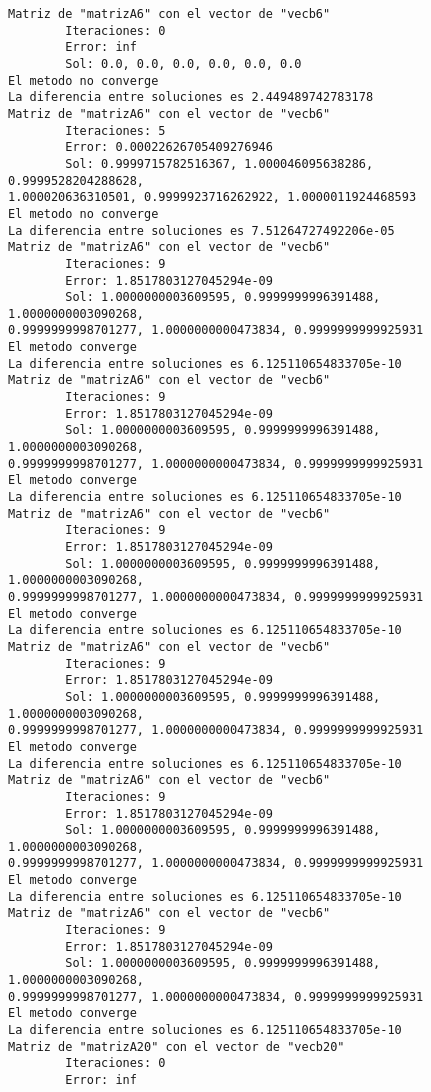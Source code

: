 \documentclass[11pt]{article}
\begin{document}
    \begin{Verbatim}[commandchars=\\\{\}]
Matriz de "matrizA6" con el vector de "vecb6"
        Iteraciones: 0
        Error: inf
        Sol: 0.0, 0.0, 0.0, 0.0, 0.0, 0.0
El metodo no converge
La diferencia entre soluciones es 2.449489742783178
Matriz de "matrizA6" con el vector de "vecb6"
        Iteraciones: 5
        Error: 0.00022626705409276946
        Sol: 0.9999715782516367, 1.000046095638286, 0.9999528204288628,
1.000020636310501, 0.9999923716262922, 1.0000011924468593
El metodo no converge
La diferencia entre soluciones es 7.51264727492206e-05
Matriz de "matrizA6" con el vector de "vecb6"
        Iteraciones: 9
        Error: 1.8517803127045294e-09
        Sol: 1.0000000003609595, 0.9999999996391488, 1.0000000003090268,
0.9999999998701277, 1.0000000000473834, 0.9999999999925931
El metodo converge
La diferencia entre soluciones es 6.125110654833705e-10
Matriz de "matrizA6" con el vector de "vecb6"
        Iteraciones: 9
        Error: 1.8517803127045294e-09
        Sol: 1.0000000003609595, 0.9999999996391488, 1.0000000003090268,
0.9999999998701277, 1.0000000000473834, 0.9999999999925931
El metodo converge
La diferencia entre soluciones es 6.125110654833705e-10
Matriz de "matrizA6" con el vector de "vecb6"
        Iteraciones: 9
        Error: 1.8517803127045294e-09
        Sol: 1.0000000003609595, 0.9999999996391488, 1.0000000003090268,
0.9999999998701277, 1.0000000000473834, 0.9999999999925931
El metodo converge
La diferencia entre soluciones es 6.125110654833705e-10
Matriz de "matrizA6" con el vector de "vecb6"
        Iteraciones: 9
        Error: 1.8517803127045294e-09
        Sol: 1.0000000003609595, 0.9999999996391488, 1.0000000003090268,
0.9999999998701277, 1.0000000000473834, 0.9999999999925931
El metodo converge
La diferencia entre soluciones es 6.125110654833705e-10
Matriz de "matrizA6" con el vector de "vecb6"
        Iteraciones: 9
        Error: 1.8517803127045294e-09
        Sol: 1.0000000003609595, 0.9999999996391488, 1.0000000003090268,
0.9999999998701277, 1.0000000000473834, 0.9999999999925931
El metodo converge
La diferencia entre soluciones es 6.125110654833705e-10
Matriz de "matrizA6" con el vector de "vecb6"
        Iteraciones: 9
        Error: 1.8517803127045294e-09
        Sol: 1.0000000003609595, 0.9999999996391488, 1.0000000003090268,
0.9999999998701277, 1.0000000000473834, 0.9999999999925931
El metodo converge
La diferencia entre soluciones es 6.125110654833705e-10
Matriz de "matrizA20" con el vector de "vecb20"
        Iteraciones: 0
        Error: inf

\end{Verbatim}
\end{document}
